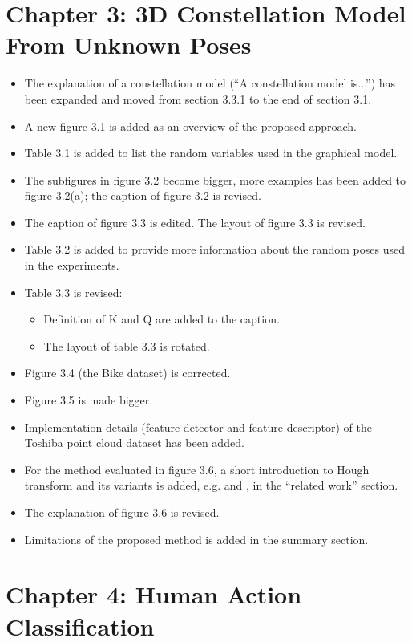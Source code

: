 \documentclass[10pt, a4paper]{article}
\begin{document}
\section{Chapter 3: 3D Constellation Model From Unknown Poses}
\begin{itemize}
\item The explanation of a constellation model (``A constellation model is...'') has been expanded and moved from section 3.3.1 to the end of section 3.1. 
\item A new figure 3.1 is added as an overview of the proposed approach. 
\item Table 3.1 is added to list the random variables used in the graphical model.
\item The subfigures in figure 3.2 become bigger, more examples has been added to figure 3.2(a); the caption of figure 3.2 is revised.
\item The caption of figure 3.3 is edited. The layout of figure 3.3 is revised.
\item Table 3.2 is added to provide more information about the random poses used in the experiments.
\item Table 3.3 is revised:
	\begin{itemize}
	\item Definition of K and Q are added to the caption.
	\item The layout of table 3.3 is rotated.
	\end{itemize}
\item Figure 3.4 (the Bike dataset) is corrected.
\item Figure 3.5 is made bigger.
\item Implementation details (feature detector and feature descriptor) of the Toshiba point cloud dataset has been added.
\item For the method evaluated in figure 3.6, a short introduction to Hough transform and its variants is added, e.g. \cite{Woodford2013} and \cite{Barinova2010}, in the ``related work'' section.
\item The explanation of figure 3.6 is revised.
\item Limitations of the proposed method is added in the summary section.
\end{itemize}

\section{Chapter 4: Human Action Classification}
\end{document}
